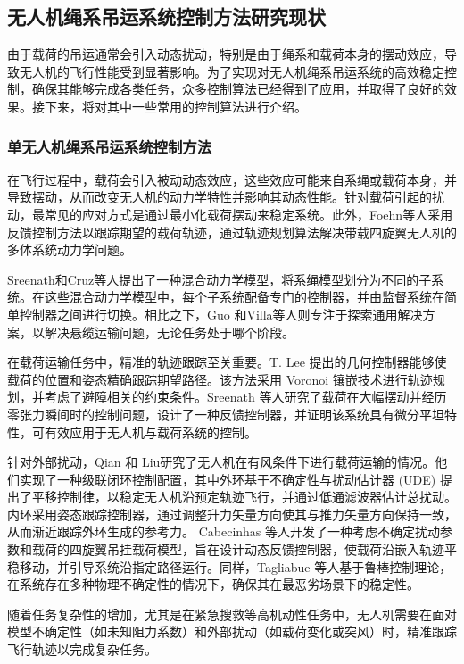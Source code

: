 \documentclass[lang=chs, degree=master, blindreview=false, winfonts=true]{yanputhesis}
\begin{document}
\subsection{无人机绳系吊运系统控制方法研究现状}
由于载荷的吊运通常会引入动态扰动，特别是由于绳系和载荷本身的摆动效应，导致无人机的飞行性能受到显著影响。为了实现对无人机绳系吊运系统的高效稳定控制，确保其能够完成各类任务，众多控制算法已经得到了应用，并取得了良好的效果。接下来，将对其中一些常用的控制算法进行介绍。
\subsubsection{单无人机绳系吊运系统控制方法}
在飞行过程中，载荷会引入被动动态效应，这些效应可能来自系绳或载荷本身，并导致摆动，从而改变无人机的动力学特性并影响其动态性能。针对载荷引起的扰动，最常见的应对方式是通过最小化载荷摆动来稳定系统\cite{lv2022finite,2019An}。此外，Foehn等人采用反馈控制方法以跟踪期望的载荷轨迹，通过轨迹规划算法解决带载四旋翼无人机的多体系统动力学问题\cite{Foehn-RSS-17}。

Sreenath和Cruz等人提出了一种混合动力学模型，将系绳模型划分为不同的子系统。在这些混合动力学模型中，每个子系统配备专门的控制器，并由监督系统在简单控制器之间进行切换\cite{sreenath2013trajectory,cruz2015lift}。相比之下，Guo 和Villa等人则专注于探索通用解决方案，以解决悬缆运输问题，无论任务处于哪个阶段\cite{guo2020multiple,villa2021cooperative}。

在载荷运输任务中，精准的轨迹跟踪至关重要。T. Lee 提出的几何控制器能够使载荷的位置和姿态精确跟踪期望路径\cite{lee2015collision,lee2017geometric}。该方法采用 Voronoi 镶嵌技术进行轨迹规划，并考虑了避障相关的约束条件。Sreenath 等人研究了载荷在大幅摆动并经历零张力瞬间时的控制问题，设计了一种反馈控制器，并证明该系统具有微分平坦特性，可有效应用于无人机与载荷系统的控制\cite{sreenath2013trajectory}。

针对外部扰动，Qian 和 Liu研究了无人机在有风条件下进行载荷运输的情况\cite{qian2019path}。他们实现了一种级联闭环控制配置，其中外环基于不确定性与扰动估计器 (UDE) 提出了平移控制律，以稳定无人机沿预定轨迹飞行，并通过低通滤波器估计总扰动。内环采用姿态跟踪控制器，通过调整升力矢量方向使其与推力矢量方向保持一致，从而渐近跟踪外环生成的参考力。
Cabecinhas 等人开发了一种考虑不确定扰动参数和载荷的四旋翼吊挂载荷模型，旨在设计动态反馈控制器，使载荷沿嵌入轨迹平稳移动，并引导系统沿指定路径运行\cite{cabecinhas2019trajectory}。同样，Tagliabue 等人基于鲁棒控制理论，在系统存在多种物理不确定性的情况下，确保其在最恶劣场景下的稳定性\cite{2019Robust}。

随着任务复杂性的增加，尤其是在紧急搜救等高机动性任务中，无人机需要在面对模型不确定性（如未知阻力系数）和外部扰动（如载荷变化或突风）时，精准跟踪飞行轨迹以完成复杂任务。
\end{document}
